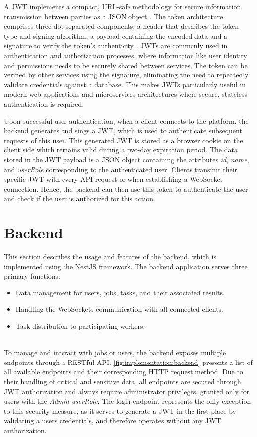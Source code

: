 A \ac{JWT} implements a compact, \acs{URL}-safe methodology for secure information transmission between parties as a \ac{JSON} object \cite{implementation:jwt}. The token architecture comprises three dot-separated components: a header that describes the token type and signing algorithm, a payload containing the encoded data and a signature to verify the token's authenticity \cite{implementation:jwt}. \ac{JWT}s are commonly used in authentication and authorization processes, where information like user identity and permissions needs to be securely shared between services. The token can be verified by other services using the signature, eliminating the need to repeatedly validate credentials against a database. This makes \ac{JWT}s particularly useful in modern web applications and microservices architectures where secure, stateless authentication is required. \cite{implementation:jwt}

Upon successful user authentication, when a client connects to the platform, the backend generates and sings a \ac{JWT}, which is used to authenticate subsequent requests of this user. This generated \ac{JWT} is stored as a browser cookie on the client side which remains valid during a two-day expiration period. The data stored in the \ac{JWT} payload is a \ac{JSON} object containing the attributes \emph{id}, \emph{name}, and \emph{userRole} corresponding to the authenticated user. Clients transmit their specific \ac{JWT} with every \ac{API} request or when establishing a WebSocket connection. Hence, the backend can then use this token to authenticate the user and check if the user is authorized for this action.

\section{Backend}
\label{sec:implementation:backend}
This section describes the usage and features of the backend, which is implemented using the NestJS \cite{methodology:nestjs} framework. The backend application serves three primary functions: 
\begin{itemize}
    \item Data management for users, jobs, tasks, and their associated results.
    \item Handling the WebSockets communication with all connected clients.
    \item Task distribution to participating workers.
\end{itemize}
~\\
To manage and interact with jobs or users, the backend exposes multiple endpoints through a \acs{REST}ful \ac{API}. \autoref{fig:implementation:backend} presents a list of all available endpoints and their corresponding \acs{HTTP} request method. Due to their handling of critical and sensitive data, all endpoints are secured through \ac{JWT} authorization and always require administrator privileges, granted only for users with the \emph{Admin} \emph{userRole}. The login endpoint represents the only exception to this security measure, as it serves to generate a \ac{JWT} in the first place by validating a users credentials, and therefore operates without any \ac{JWT} authorization.

